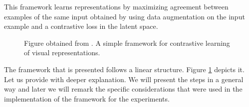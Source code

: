 This framework learns representations by maximizing agreement between examples of the same input obtained by using data augmentation on the input example and a contrastive loss in the latent space. 


\begin{figure}[H]
    \small
        \centering
        \caption{Figure obtained from \cite{chen_simple_2020}. A simple framework for contrastive learning of visual representations.}
        \label{fig:framework:SimCLR}
    \end{figure}


The framework that is presented follows a linear structure. Figure \ref{fig:framework:SimCLR} depicts it. Let us provide with deeper explanation. We will present the steps in a general way and later we will remark the specific considerations that were used in the implementation of the framework for the experiments. 

